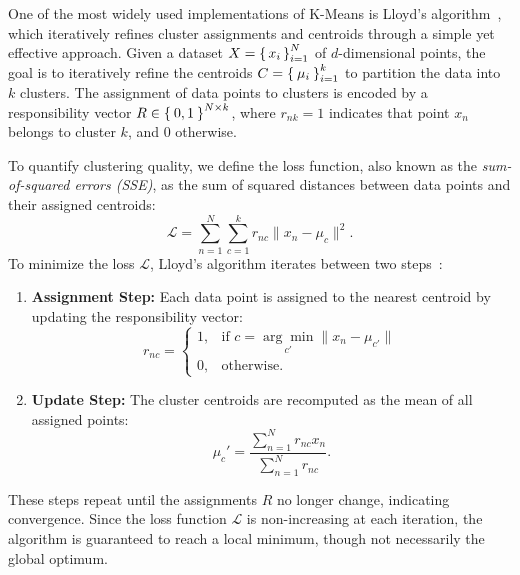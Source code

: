\documentclass[10pt,twocolumn,letterpaper]{article}
\begin{document}
One of the most widely used implementations of K-Means is Lloyd’s
algorithm~\cite{deuschle2019}, which iteratively refines cluster assignments
and centroids through a simple yet effective approach. Given a dataset
$X=\set{x_i}_{i=1}^N$ of $d$-dimensional points, the goal is to iteratively
refine the centroids $C=\Set{\mu_i}_{i=1}^k$ to partition the data into $k$
clusters. The assignment of data points to clusters is encoded by a
responsibility vector $R\in\Set{0,1}^{N\times k}$, where $r_{nk}=1$ indicates
that point $x_n$ belongs to cluster $k$, and $0$ otherwise.

To quantify clustering quality, we define the loss function, also known as the
\textit{sum-of-squared errors (SSE)}, as the sum of squared distances between
data points and their assigned centroids:
\begin{equation}
    \label{eq:lloyds-loss}
    \mathcal{L} = \sum_{n=1}^{N} \sum_{c=1}^{k} r_{nc} \|x_n - \mu_c\|^2.
\end{equation}
To minimize the loss $\mathcal{L}$, Lloyd's algorithm iterates between two steps~\cite{deuschle2019, FRANTI201995}:
\begin{enumerate}
    \item \textbf{Assignment Step:} Each data point is assigned to the nearest centroid by updating the responsibility vector:
          \begin{equation}
              \label{eq:lloyds-res-vec}
              r_{nc} =
              \begin{cases}
                  1, & \text{if } c = \underset{c'}{\arg\min} \|x_n - \mu_{c'}\| \\
                  0, & \text{otherwise.}
              \end{cases}
          \end{equation}
    \item \textbf{Update Step:} The cluster centroids are recomputed as the mean of all assigned points:
          \begin{equation}
              \label{eq:min-lloyds-loss}
              \mu_c' = \frac{\sum_{n=1}^{N} r_{nc} x_n}{\sum_{n=1}^{N} r_{nc}}.
          \end{equation}
\end{enumerate}
These steps repeat until the assignments $R$ no longer change, indicating
convergence. Since the loss function $\mathcal{L}$ is non-increasing at each
iteration, the algorithm is guaranteed to reach a local minimum, though not
necessarily the global optimum.
\end{document}
